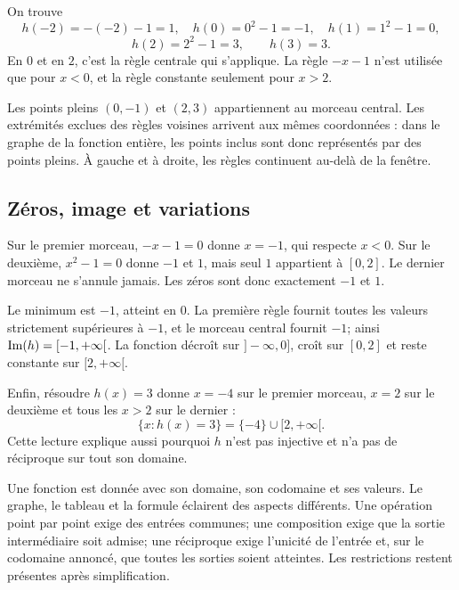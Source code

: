 \begin{examplebox}[title={Calculer aux raccords et dans chaque morceau}]
On trouve
\[
h(-2)=-(-2)-1=1,\quad h(0)=0^2-1=-1,\quad h(1)=1^2-1=0,
\]
\[
h(2)=2^2-1=3,\qquad h(3)=3.
\]
En \(0\) et en \(2\), c'est la règle centrale qui s'applique. La règle \(-x-1\) n'est utilisée que pour \(x<0\), et la règle constante seulement pour \(x>2\).
\end{examplebox}

\begin{center}
\end{center}

Les points pleins \((0,-1)\) et \((2,3)\) appartiennent au morceau central. Les extrémités exclues des règles voisines arrivent aux mêmes coordonnées : dans le graphe de la fonction entière, les points inclus sont donc représentés par des points pleins. À gauche et à droite, les règles continuent au-delà de la fenêtre.

\subsection*{Zéros, image et variations}
Sur le premier morceau, \(-x-1=0\) donne \(x=-1\), qui respecte \(x<0\). Sur le deuxième, \(x^2-1=0\) donne \(-1\) et \(1\), mais seul \(1\) appartient à \([0,2]\). Le dernier morceau ne s'annule jamais. Les zéros sont donc exactement \(-1\) et \(1\).

Le minimum est \(-1\), atteint en \(0\). La première règle fournit toutes les valeurs strictement supérieures à \(-1\), et le morceau central fournit \(-1\); ainsi \(\operatorname{Im}(h)=[-1,+\infty[\). La fonction décroît sur \(]-\infty,0]\), croît sur \([0,2]\) et reste constante sur \([2,+\infty[\).

Enfin, résoudre \(h(x)=3\) donne \(x=-4\) sur le premier morceau, \(x=2\) sur le deuxième et tous les \(x>2\) sur le dernier :
\[
\{x:h(x)=3\}=\{-4\}\cup[2,+\infty[.
\]
Cette lecture explique aussi pourquoi \(h\) n'est pas injective et n'a pas de réciproque sur tout son domaine.

\begin{summarybox}
Une fonction est donnée avec son domaine, son codomaine et ses valeurs. Le graphe, le tableau et la formule éclairent des aspects différents. Une opération point par point exige des entrées communes; une composition exige que la sortie intermédiaire soit admise; une réciproque exige l'unicité de l'entrée et, sur le codomaine annoncé, que toutes les sorties soient atteintes. Les restrictions restent présentes après simplification.
\end{summarybox}
